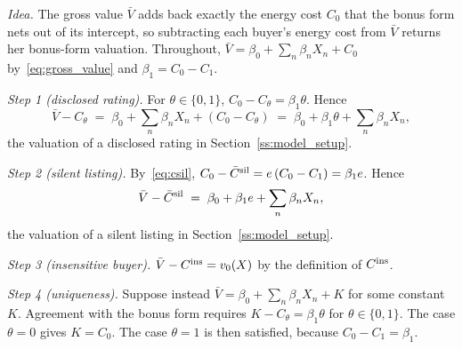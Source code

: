 \upshape
\emph{Idea.} The gross value $\bar V$ adds back exactly the energy cost $C_0$ that the bonus form nets out of its intercept, so subtracting each buyer's energy cost from $\bar V$ returns her bonus-form valuation. Throughout, $\bar V=\beta_0+\sum_n\beta_nX_n+C_0$ by~\eqref{eq:gross_value} and $\beta_1=C_0-C_1$.

\emph{Step 1 (disclosed rating).} For $\theta\in\{0,1\}$, $C_0-C_\theta=\beta_1\theta$. Hence
\begin{equation*}
    \bar V-C_\theta\;=\;\beta_0+\sum_n\beta_nX_n+(C_0-C_\theta)\;=\;\beta_0+\beta_1\theta+\sum_n\beta_nX_n,
\end{equation*}
the valuation of a disclosed rating in Section~\ref{ss:model_setup}.

\emph{Step 2 (silent listing).} By~\eqref{eq:csil}, $C_0-\bar C^{\rm sil}=e\,(C_0-C_1)=\beta_1e$. Hence
\begin{equation*}
    \bar V-\bar C^{\rm sil}\;=\;\beta_0+\beta_1e+\sum_n\beta_nX_n,
\end{equation*}
the valuation of a silent listing in Section~\ref{ss:model_setup}.

\emph{Step 3 (insensitive buyer).} $\bar V-C^{\rm ins}=v_0(X)$ by the definition of $C^{\rm ins}$.

\emph{Step 4 (uniqueness).} Suppose instead $\bar V=\beta_0+\sum_n\beta_nX_n+K$ for some constant $K$. Agreement with the bonus form requires $K-C_\theta=\beta_1\theta$ for $\theta\in\{0,1\}$. The case $\theta=0$ gives $K=C_0$. The case $\theta=1$ is then satisfied, because $C_0-C_1=\beta_1$.
